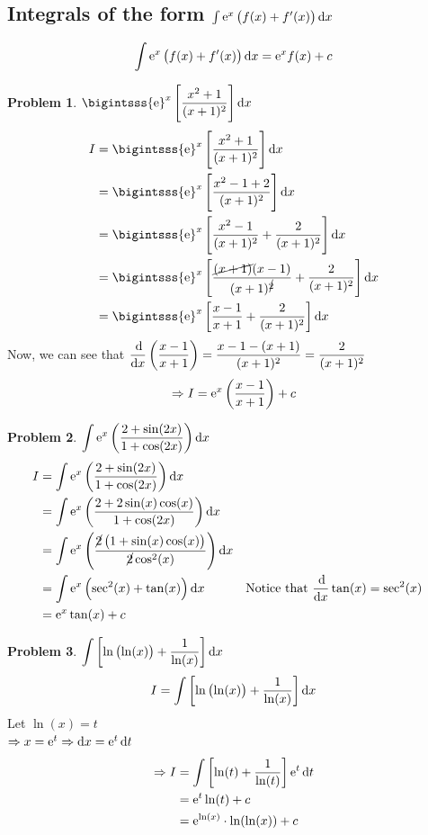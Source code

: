 \documentclass[14]{article}
\theoremstyle{definition}
\newtheorem{prob}{Problem}
\theoremstyle{case}
\begin{document}
\subsection{Integrals of the form $\int {\rm e}^x \left( f(x) + f'(x) \right) \dif x$}
\[\int {\rm e}^x \left( f(x) + f'(x)\right) \dif x = {\rm e}^x f(x) + c\]
\pagebreak
\begin{prob}
$\displaystyle \bigintsss {\rm e}^x \left[ \dfrac{x^2 + 1}{(x + 1)^2} \right]\dif x$
\begin{align*}
I &= \bigintsss {\rm e}^x \left[ \dfrac{x^2 + 1}{(x + 1)^2}\right]\dif x\\
&= \bigintsss {\rm e}^x \left[ \dfrac{x^2 - 1 + 2}{(x + 1)^2}\right]\dif x\\
&=\bigintsss {\rm e}^x \left[ \dfrac{x^2 - 1}{(x + 1)^2} +  \dfrac{2}{(x + 1)^2} \right]\dif x\\
&=\bigintsss {\rm e}^x \left[ \dfrac{\cancel{(x+1)}(x-1)}{(x + 1)^{\cancel{2}}} +  \dfrac{2}{(x + 1)^2} \right]\dif x\\
&=\bigintsss {\rm e}^x \left[ \dfrac{x - 1}{x + 1} +  \dfrac{2}{(x + 1)^2} \right]\dif x
\end{align*}
Now, we can see that $\dfrac{\dif}{\dif x}\left(\dfrac{x-1}{x+1}\right) = \dfrac{x-1 - (x + 1)}{(x+1)^2} = \dfrac2{(x+1)^2}$
\[\Rightarrow I = {\rm e}^x\left(\dfrac{x-1}{x+1}\right) + c\]
\end{prob}
\begin{prob}
$\displaystyle \int {\rm e}^x \left( \dfrac{2+ \sin(2x)}{1+\cos(2x)}\right)\dif x $
\begin{align*}
I &= \int {\rm e}^x \left( \dfrac{2+ \sin(2x)}{1+\cos(2x)}\right)\dif x\\
&= \int {\rm e}^x \left( \dfrac{2+ 2\sin(x)\cos(x)}{1+\cos(2x)}\right)\dif x\\
&= \int {\rm e}^x \left( \dfrac{\cancel{2} \left(1 + \sin(x)\cos(x)\right)}{\cancel{2}\cos^2(x)}\right)\dif x\\
&= \int {\rm e}^x \left(\sec^2(x) + \tan(x)\right)\dif x && \text{Notice that } \dfrac{\dif}{\dif x}\tan(x) = \sec^2(x)\\
&= {\rm e}^x \tan(x) + c
\end{align*}
\end{prob}
\begin{prob}
$\displaystyle \int \left[\ln\left(\ln(x)\right)+ \dfrac1{\ln(x)} \right] \dif x$
\[I = \int \left[\ln\left(\ln(x)\right)+ \dfrac1{\ln(x)} \right] \dif x\]
Let $\ln(x) = t$\\
$\Rightarrow x = {\rm e}^t \\\Rightarrow \dif x = {\rm e}^t \dif t$
\begin{align*}
\Rightarrow I &= \int \left[ \ln(t) + \dfrac1{\ln(t)} \right] {\rm e}^t \dif t\\
&= {\rm e}^t \ln(t) + c\\ &= {\rm e}^{\ln(x)}\cdot \ln(\ln(x)) + c
\end{align*}
\end{prob}
\pagebreak
\end{document}
